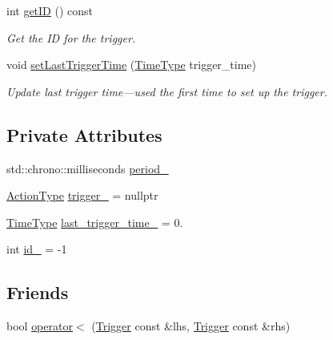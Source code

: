 \begin{DoxyCompactItemize}
int \hyperlink{structvt_1_1timetrigger_1_1_trigger_add9337af4c0c64a4d9903555d2d74835}{get\+ID} () const
\begin{DoxyCompactList}\small\item\em Get the ID for the trigger. \end{DoxyCompactList}\item 
void \hyperlink{structvt_1_1timetrigger_1_1_trigger_aae694885195a12a0bd7274859bfaa0ba}{set\+Last\+Trigger\+Time} (\hyperlink{namespacevt_a876a9d0cd5a952859c72de8a46881442}{Time\+Type} trigger\+\_\+time)
\begin{DoxyCompactList}\small\item\em Update last trigger time---used the first time to set up the trigger. \end{DoxyCompactList}\end{DoxyCompactItemize}
\subsection*{Private Attributes}
\begin{DoxyCompactItemize}
\item 
std\+::chrono\+::milliseconds \hyperlink{structvt_1_1timetrigger_1_1_trigger_aa95009a5d9a17ffdb84b5317a7a5dfc2}{period\+\_\+}
\item 
\hyperlink{namespacevt_ae0a5a7b18cc99d7b732cb4d44f46b0f3}{Action\+Type} \hyperlink{structvt_1_1timetrigger_1_1_trigger_ac1d93e6fff9b0faa8889198e481d50d4}{trigger\+\_\+} = nullptr
\item 
\hyperlink{namespacevt_a876a9d0cd5a952859c72de8a46881442}{Time\+Type} \hyperlink{structvt_1_1timetrigger_1_1_trigger_ac844f5940943ca203c90dd485d47a0c6}{last\+\_\+trigger\+\_\+time\+\_\+} = 0.
\item 
int \hyperlink{structvt_1_1timetrigger_1_1_trigger_a1a640c2311fa49ed0a7b79480dda4439}{id\+\_\+} = -\/1
\end{DoxyCompactItemize}
\subsection*{Friends}
\begin{DoxyCompactItemize}
\item 
bool \hyperlink{structvt_1_1timetrigger_1_1_trigger_a9e42ae58737ff5be162e315dd41b1ee2}{operator$<$} (\hyperlink{structvt_1_1timetrigger_1_1_trigger}{Trigger} const \&lhs, \hyperlink{structvt_1_1timetrigger_1_1_trigger}{Trigger} const \&rhs)
\end{DoxyCompactItemize}


